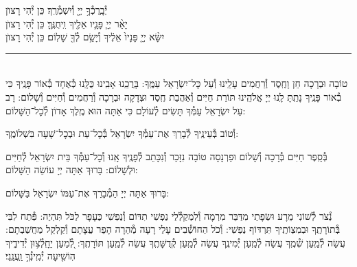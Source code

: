 \documentclass[twoside, openany, parskip=half, 11pt]{book}
\begin{document}
יְ֯בָֽרֶכְ֯ךָ֥ יְיָ֖ וְ֯יִשְׁמְ֯רֶֽךָ׃ \hfill \kahal כֵּן יְ֯הִי רָצוׂן \\
יָאֵ֨ר יְיָ֧ פָּנָ֛יו אֵלֶ֖יךָ וִֽיחֻנֶּֽךָּ׃ \hfill \kahal כֵּן יְ֯הִי רָצוׂן \\
יִשָּׂ֨א יְיָ֤ פָּנָיו֙ אֵלֶ֔יךָ וְ֯יָשֵׂ֥ם לְ֯ךָ֖ שָׁלֽוֹם׃ \hfill \kahal כֵּן יְ֯הִי רָצוׂן

\rule[-0.5ex]{3in}{1pt}

\begin{paracol}{2}
\\
טוֹבָה וּבְרָכָה חֵן וָחֶֽסֶד וְ֯רַחֲמִים עָלֵֽינוּ וְ֯עַל כׇּל־יִשְׂרָאֵל עַמֶּֽךָ: בָּרֲכֵֽנוּ אָבִֽינוּ כֻּלָּֽנוּ כְּ֯אֶחָד בְּ֯אוֹר פָּנֶֽיךָ כִּי בְ֯אוֹר פָּנֶֽיךָ נָתַֽתָּ לָֽנוּ יְיָ אֱלֹהֵֽינוּ תּוֹרַת חַיִּים וְ֯אַהֲבַת חֶֽסֶד וּצְדָקָה וּבְרָכָה וְ֯רַחֲמִים וְ֯חַיִּים וְ֯שָׁלוֹם:
\switchcolumn
{}
רָב עַל יִשְׂרָאֵל עַמְּ֯ךָ תָּשִׂים לְ֯עוֹלָם כִּי אַתָּה הוּא מֶֽלֶךְ אָדוֹן לְ֯כׇל־הַשָּׁלוֹם:
\end{paracol}
וְ֯טוֹב בְּ֯עֵינֶֽיךָ לְ֯בָרֵךְ אֶת־עַמְּ֯ךָ יִשְׂרָאֵל בְּ֯כׇל־עֵת וּבְכׇל־שָׁעָה בִּשְׁלוֹמֶֽךָ:


\begin{paracol}{2}
\begin{small}
בְּ֯סֵֽפֶר חַיִּים בְּ֯רָכָה וְ֯שָׁלוֹם וּפַרְנָסָה טוֹבָה נִזָּכֵר וְ֯נִכָּתֵב לְ֯פָנֶֽיךָ אָֽנוּ וְ֯כׇל־עַמְּ֯ךָ בֵּית יִשְׂרָאֵל לְ֯חַיִּים וּלְשָׁלוֹם: בָּרוּךְ אַתָּה יְיָ עוֹשֵׂה הַשָּׁלוֹם:

\end{small}
\switchcolumn
בָּרוּךְ אַתָּה יְיָ הַמְ֯בָרֵךְ אֶת־עַמּוֹ יִשְׂרָאֵל בַּשָּׁלוֹם:

\end{paracol}

נְ֯צֹר לְ֯שׁוֹנִי מֵרָע וּשְׂפָתַי מִדַּבֵּר מִרְמָה וְ֯לִמְקַלְ֯לַי נַפְשִׁי תִדּוֹם וְ֯נַפְשִׁי כֶּעָפָר לַכֹּל תִּהְיֶה: פְּ֯תַח לִבִּי בְּ֯תוֹרָתֶֽךָ וּבְמִצְוֹתֶֽיךָ תִּרְדּוֹף נַפְשִׁי: וְ֯כֹל הַחוֹשְׁ֯בִים עָלַי רָעָה מְ֯הֵרָה הָפֵר עֲצָתָם וְ֯קַלְקֵל מַחֲשַׁבְתָם: עֲשֵׂה לְ֯מַֽעַן שְׁ֯מֶֽךָ עֲשֵׂה לְ֯מַֽעַן יְ֯מִינֶֽךָ עֲשֵׂה לְ֯מַֽעַן קְ֯דֻשָּׁתֶֽךָ עֲשֵׂה לְ֯מַֽעַן תּוֹרָתֶֽךָ: לְ֭֯מַעַן יֵחָֽלְ֯צ֥וּן יְ֯דִידֶ֑יךָ הֽוֹשִׁ֖יעָה יְ֯מִֽינְ֯ךָ֣ וַֽעֲנֵֽנִי׃
\end{document}
